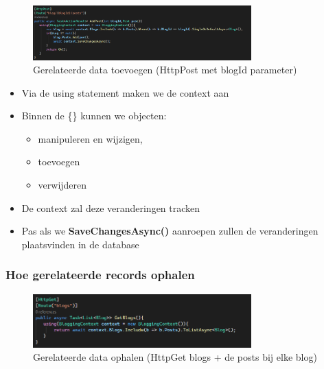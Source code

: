 \documentclass{article}
\begin{document}
\begin{figure}[H]
    \centering
    \includegraphics[width=0.75\textwidth]{efcore-insert-related.png}
    \caption{Gerelateerde data toevoegen (HttpPost met blogId parameter)}
\end{figure}


\begin{itemize}
    \item Via de using statement maken we de context aan
    \item Binnen de \{\} kunnen we objecten:
    \begin{itemize}
        \item manipuleren en wijzigen, 
        \item toevoegen
        \item verwijderen
    \end{itemize}
    \item De context zal deze veranderingen tracken
    \item Pas als we \textbf{SaveChangesAsync()} aanroepen zullen de veranderingen plaatsvinden in de database
\end{itemize}

\subsubsection{Hoe gerelateerde records ophalen}

\begin{figure}[H]
    \centering
    \includegraphics[width=0.75\textwidth]{efcore-select-related.png}
    \caption{Gerelateerde data ophalen (HttpGet blogs + de posts bij elke blog)}
\end{figure}
\end{document}
